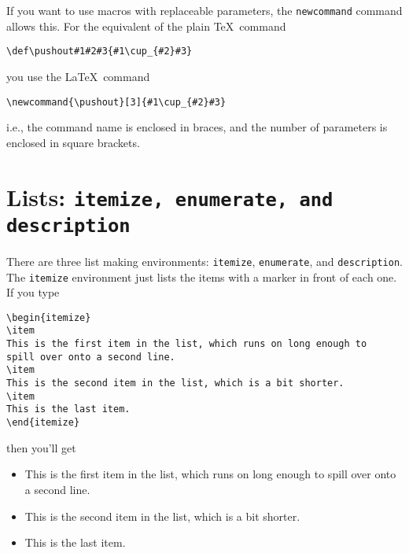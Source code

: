 If you want to use macros with replaceable parameters, the
\verb"newcommand" command allows this.  For the equivalent of the
plain \TeX\ command
\begin{center}
\verb"\def\pushout#1#2#3{#1\cup_{#2}#3}"
\end{center}
you use the \LaTeX\ command
\begin{center}
\verb"\newcommand{\pushout}[3]{#1\cup_{#2}#3}"
\end{center}
i.e., the command name is enclosed in braces, and the number of
parameters is enclosed in square brackets.



\section{Lists: {\tt itemize, enumerate, and description}}

There are three list making environments: {\tt itemize},
{\tt enumerate}, and {\tt description}.  The {\tt itemize}
environment just lists the items with a marker in front of each one.
If you type
%
\begin{verbatim}
\begin{itemize}
\item
This is the first item in the list, which runs on long enough to
spill over onto a second line.
\item
This is the second item in the list, which is a bit shorter.
\item
This is the last item.
\end{itemize}
\end{verbatim}
%
then you'll get
%
\begin{itemize}
\item
This is the first item in the list, which runs on long enough to
spill over onto a second line.
\item
This is the second item in the list, which is a bit shorter.
\item
This is the last item.
\end{itemize}



